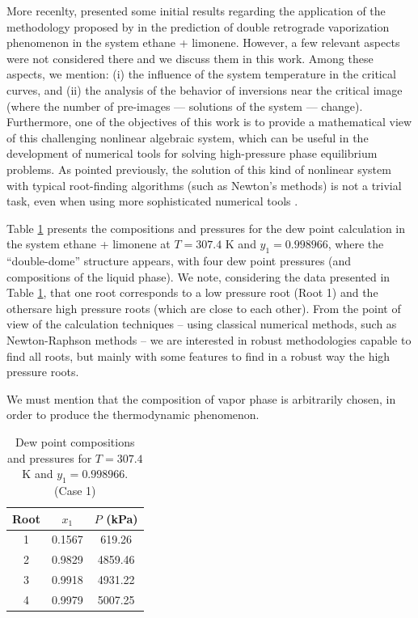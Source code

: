 \documentclass[journal=iecred,manuscript=article]{achemso}
\theoremstyle{definition}
\theoremstyle{remark}
\begin{document}
More recenlty, \citet{ireme} presented some initial results regarding the application of the methodology proposed by \citet{malta} in the prediction of double retrograde vaporization phenomenon in the system ethane + limonene. However, a few relevant aspects were not considered there and we discuss them in this work. Among these aspects, we mention: (i) the influence of the system temperature in the critical curves, and (ii) the analysis of the behavior of inversions near the critical image (where the number of pre-images --- solutions of the system --- change). Furthermore, one of the objectives of this work is to provide a mathematical view of this challenging nonlinear algebraic system, which can be useful in the development of numerical tools for solving high-pressure phase equilibrium problems. As pointed previously, the solution of this kind of nonlinear system with typical root-finding algorithms (such as Newton's methods) is not a trivial task, even when using more sophisticated numerical tools \cite{jnsa}.

Table \ref{tab:roots_double_dome} presents the compositions and pressures for the dew point calculation in the system ethane + limonene at $T = 307.4$ K and $y_1 = 0.998966$, where the ``double-dome'' structure appears, with four dew point pressures (and compositions of the liquid phase). We note, considering the data presented in Table \ref{tab:roots_double_dome}, that one root corresponds to a low pressure root (Root 1) and the othersare high pressure roots (which are close to each other). From the point of view of the calculation techniques -- using classical numerical methods, such as Newton-Raphson methods -- we are interested in robust methodologies capable to find all roots, but mainly with some features to find in a robust way the high pressure roots.

We must mention that the composition of vapor phase is arbitrarily chosen, in order to produce the thermodynamic phenomenon.

\begin{table}[http!]
	\begin{center}
	\begin{tabular}{ccc} \hline \small
Root & $x_1$ & $P$ (kPa) \\
\hline
1 & 0.1567 & 619.26 \\
2 & 0.9829 & 4859.46 \\
3 & 0.9918 & 4931.22 \\
4 & 0.9979 & 5007.25 \\
	\hline
	\end{tabular}
	\caption{ {\small Dew point compositions and pressures for $T = 307.4$ K and $y_1 = 0.998966$. (Case 1)}}\label{tab:roots_double_dome}
	\end{center}
\end{table}
\end{document}
